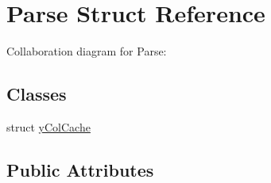 \hypertarget{structParse}{}\section{Parse Struct Reference}
\label{structParse}


Collaboration diagram for Parse\+:
\subsection*{Classes}
\begin{DoxyCompactItemize}
\item 
struct \hyperlink{structParse_1_1yColCache}{y\+Col\+Cache}
\end{DoxyCompactItemize}
\subsection*{Public Attributes}
